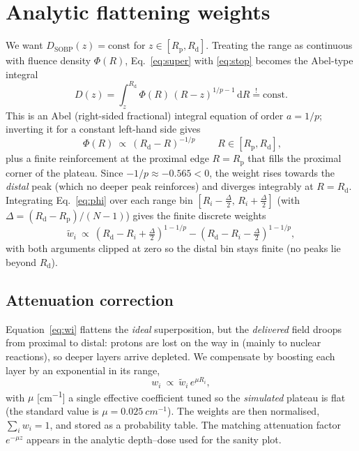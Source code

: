 \documentclass[11pt]{article}
\newcommand{\Rd}{R_{\mathrm d}}
\newcommand{\Rp}{R_{\mathrm p}}
\begin{document}
\section{Analytic flattening weights}
\label{sec:weights}

We want $D_{\mathrm{SOBP}}(z)=\text{const}$ for $z\in[\Rp,\Rd]$. Treating the
range as continuous with fluence density $\Phi(R)$, Eq.~\eqref{eq:super} with
\eqref{eq:stop} becomes the Abel-type integral
\begin{equation}
D(z)=\int_z^{\Rd}\Phi(R)\,(R-z)^{1/p-1}\,\mathrm dR \stackrel{!}{=}\text{const}.
\end{equation}
This is an Abel (right-sided fractional) integral equation of order $a=1/p$;
inverting it for a constant left-hand side gives
\begin{equation}
\boxed{\;\Phi(R)\ \propto\ (\Rd-R)^{-1/p}\;}\qquad R\in[\Rp,\Rd],
\label{eq:phi}
\end{equation}
plus a finite reinforcement at the proximal edge $R=\Rp$ that fills the proximal
corner of the plateau. Since $-1/p\approx-0.565<0$, the weight rises towards the
\emph{distal} peak (which no deeper peak reinforces) and diverges integrably at
$R=\Rd$. Integrating Eq.~\eqref{eq:phi} over each range bin
$[R_i-\tfrac{\Delta}{2},\,R_i+\tfrac{\Delta}{2}]$ (with $\Delta=(\Rd-\Rp)/(N-1)$)
gives the finite discrete weights
\begin{equation}
\tilde w_i\ \propto\ (\Rd-R_i+\tfrac{\Delta}{2})^{1-1/p}-(\Rd-R_i-\tfrac{\Delta}{2})^{1-1/p},
\label{eq:wi}
\end{equation}
with both arguments clipped at zero so the distal bin stays finite (no peaks lie
beyond $\Rd$).

\subsection{Attenuation correction}
\label{sec:atten}

Equation~\eqref{eq:wi} flattens the \emph{ideal} superposition, but the
\emph{delivered} field droops from proximal to distal: protons are lost on the
way in (mainly to nuclear reactions), so deeper layers arrive depleted. We
compensate by boosting each layer by an exponential in its range,
\begin{equation}
w_i\ \propto\ \tilde w_i\,e^{\mu R_i},
\label{eq:atten}
\end{equation}
with $\mu$ [\si{cm^{-1}}] a single effective coefficient tuned so the
\emph{simulated} plateau is flat (the standard value is
$\mu=\SI{0.025}{cm^{-1}}$). The weights are then normalised, $\sum_i w_i=1$, and
stored as a probability table. The matching attenuation factor $e^{-\mu z}$
appears in the analytic depth--dose used for the sanity plot.
\end{document}
